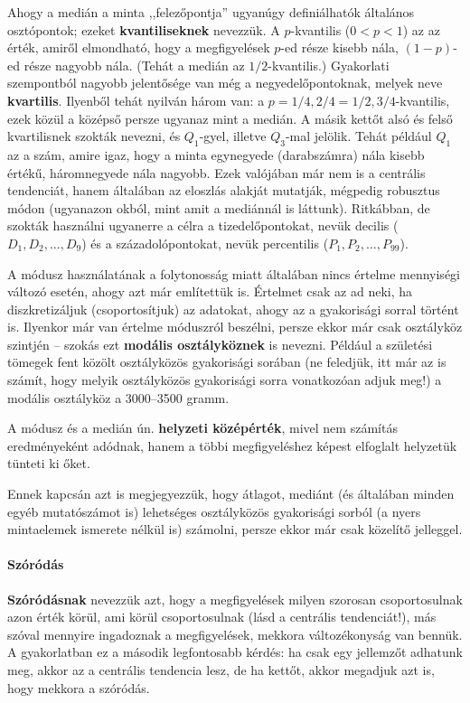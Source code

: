 \documentclass[]{book}
\let\oldparagraph\paragraph
\renewcommand{\paragraph}[1]{\oldparagraph{#1}\mbox{}}
\begin{document}
Ahogy a medián a minta ,,felezőpontja'' ugyanúgy definiálhatók általános
osztópontok; ezeket \textbf{kvantiliseknek} nevezzük. A \(p\)-kvantilis
(\(0<p<1\)) az az érték, amiről elmondható, hogy a megfigyelések
\(p\)-ed része kisebb nála, \(\left(1-p\right)\)-ed része nagyobb nála.
(Tehát a medián az \(1/2\)-kvantilis.) Gyakorlati szempontból nagyobb
jelentősége van még a negyedelőpontoknak, melyek neve
\textbf{kvartilis}. Ilyenből tehát nyilván három van: a
\(p=1/4,2/4=1/2,3/4\)-kvantilis, ezek közül a középső persze ugyanaz
mint a medián. A másik kettőt alsó és felső kvartilisnek szokták
nevezni, és \(Q_1\)-gyel, illetve \(Q_3\)-mal jelölik. Tehát például
\(Q_1\) az a szám, amire igaz, hogy a minta egynegyede (darabszámra)
nála kisebb értékű, háromnegyede nála nagyobb. Ezek valójában már nem is
a centrális tendenciát, hanem általában az eloszlás alakját mutatják,
mégpedig robusztus módon (ugyanazon okból, mint amit a mediánnál is
láttunk). Ritkábban, de szokták használni ugyanerre a célra a
tizedelőpontokat, nevük decilis (\(D_1,D_2,\ldots,D_9\)) és a
századolópontokat, nevük percentilis (\(P_1,P_2,\ldots,P_{99}\)).

A módusz használatának a folytonosság miatt általában nincs értelme
mennyiségi változó esetén, ahogy azt már említettük is. Értelmet csak az
ad neki, ha diszkretizáljuk (csoportosítjuk) az adatokat, ahogy az a
gyakorisági sorral történt is. Ilyenkor már van értelme móduszról
beszélni, persze ekkor már csak osztályköz szintjén -- szokás ezt
\textbf{modális osztályköznek} is nevezni. Például a születési tömegek
fent közölt osztályközös gyakorisági sorában (ne feledjük, itt már az is
számít, hogy melyik osztályközös gyakorisági sorra vonatkozóan adjuk
meg!) a modális osztályköz a 3000--3500 gramm.

A módusz és a medián ún. \textbf{helyzeti középérték}, mivel nem
számítás eredményeként adódnak, hanem a többi megfigyeléshez képest
elfoglalt helyzetük tünteti ki őket.

Ennek kapcsán azt is megjegyezzük, hogy átlagot, mediánt (és általában
minden egyéb mutatószámot is) lehetséges osztályközös gyakorisági sorból
(a nyers mintaelemek ismerete nélkül is) számolni, persze ekkor már csak
közelítő jelleggel.

\paragraph{Szóródás}\label{deskriptivmennyegyvaltanalitikusmutatoszamokszorodas}

\textbf{Szóródásnak} nevezzük azt, hogy a megfigyelések milyen szorosan
csoportosulnak azon érték körül, ami körül csoportosulnak (lásd a
centrális tendenciát!), más szóval mennyire ingadoznak a megfigyelések,
mekkora változékonyság van bennük. A gyakorlatban ez a második
legfontosabb kérdés: ha csak egy jellemzőt adhatunk meg, akkor az a
centrális tendencia lesz, de ha kettőt, akkor megadjuk azt is, hogy
mekkora a szóródás.
\end{document}
